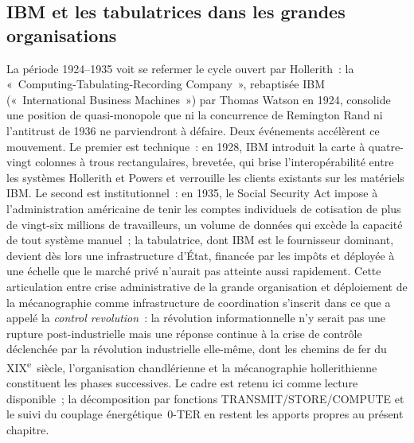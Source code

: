 \subsection{IBM et les tabulatrices dans les grandes organisations}\label{subsec:ibm_tab}

%
La période 1924--1935 voit se refermer le cycle ouvert par Hollerith~: la «~Computing-Tabulating-Recording Company~», rebaptisée IBM («~International Business Machines~») par Thomas Watson en 1924, consolide une position de quasi-monopole que ni la concurrence de Remington Rand ni l'antitrust de 1936 ne parviendront à défaire. Deux événements accélèrent ce mouvement. Le premier est technique~: en 1928, IBM introduit la carte à quatre-vingt colonnes à trous rectangulaires, brevetée, qui brise l'interopérabilité entre les systèmes Hollerith et Powers et verrouille les clients existants sur les matériels IBM. Le second est institutionnel~: en 1935, le Social Security Act impose à l'administration américaine de tenir les comptes individuels de cotisation de plus de vingt-six millions de travailleurs, un volume de données qui excède la capacité de tout système manuel~; la tabulatrice, dont IBM est le fournisseur dominant, devient dès lors une infrastructure d'État, financée par les impôts et déployée à une échelle que le marché privé n'aurait pas atteinte aussi rapidement. Cette articulation entre crise administrative de la grande organisation et déploiement de la mécanographie comme infrastructure de coordination s'inscrit dans ce que \textcite{beniger_control_1986} a appelé la \emph{control revolution}~: la révolution informationnelle n'y serait pas une rupture post-industrielle mais une réponse continue à la crise de contrôle déclenchée par la révolution industrielle elle-même, dont les chemins de fer du XIX\textsuperscript{e}~siècle, l'organisation chandlérienne et la mécanographie hollerithienne constituent les phases successives. Le cadre est retenu ici comme lecture disponible~; la décomposition par fonctions TRANSMIT/STORE/COMPUTE et le suivi du couplage énergétique~0-TER en restent les apports propres au présent chapitre.

